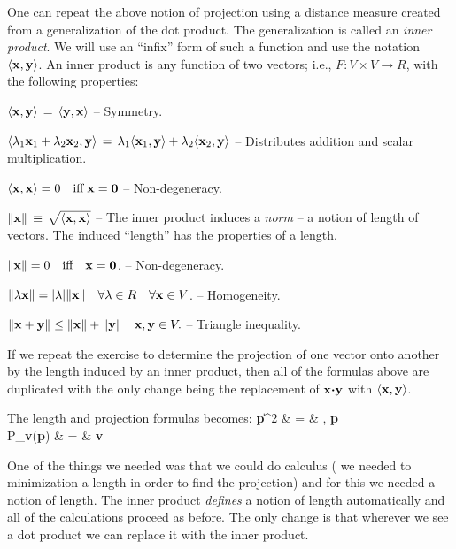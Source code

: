 \documentclass[12pt]{article}
\begin{document}
{One can repeat the above notion of projection using a distance measure created from a generalization of the dot product.
The generalization is called an {\em inner product}. We will use an ``infix'' form of such a function and use the notation
$\langle{\bf x}, {\bf y}\rangle$. An inner product is any function of two vectors; i.e., $F: V \times V \rightarrow R$,  with the following properties:
\bi
  \item{ $ \langle {\bf x}, {\bf y}\rangle \, = \, \langle{\bf y}, {\bf x}\rangle$ -- Symmetry.}
  \item{ $ \langle \lambda_1 {\bf x}_1 + \lambda_2 {\bf x}_2, {\bf y}\rangle \, = \, 
      \lambda_1 \langle{\bf x}_1, {\bf y}\rangle + \lambda_2 \langle{\bf x}_2, {\bf y}\rangle $ -- Distributes addition and scalar multiplication.}
  \item{ $ \langle {\bf x}, {\bf x}\rangle = 0 \quad \text{iff} \; {\bf x} = {\bf 0} $ -- Non-degeneracy.}
  \item{ $\|{\bf x}\| \, \equiv \, \sqrt{\langle{\bf x}, {\bf x}\rangle}$ -- 
      The inner product induces a {\em norm} -- a notion of length of vectors.}
\ei
    The induced ``length'' has the properties of a length.
\bi
  \item{$\|{\bf x}\| = 0 \quad \text{iff} \quad {\bf x} = {\bf 0}$. -- Non-degeneracy.}
  \item{$ \|\lambda {\bf x}\| = |\lambda| \|{\bf x}\|\quad \forall \lambda \in R \quad \forall {\bf x} \in V$. -- Homogeneity.}
  \item{$\|{\bf x} + {\bf y} \| \le \|{\bf x}\| + \|{\bf y}\| \quad {\bf x}, {\bf y} \in V.$ -- Triangle inequality.}
\ei

If we repeat the exercise to determine the projection of one vector onto 
another by the length induced by an inner product, then all of the 
formulas above are duplicated with the only change being the replacement 
of ${\bf x} {\boldsymbol \cdot} {\bf y}$ with $\langle{\bf x}, {\bf y}\rangle$.

The length and projection formulas becomes:
\be
  \|{\bf p}\|^2 & = & , {\bf p} \rangle \\
  P_{\bf v}({\bf p}) & = &  {\bf v}
\ee

One of the things we needed was that we could do calculus 
( we needed to minimization a length in order to find the projection)
and for this we needed a notion of length. The inner product {\em defines\/} 
a notion of length automatically and all of the calculations proceed as before.
The only change is that wherever we see a dot product we can replace it with 
the inner product.

}
\end{document}
